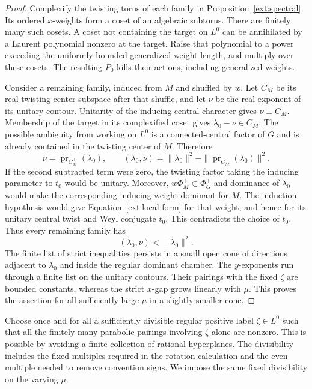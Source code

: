 \begin{proof}
 Complexify the twisting torus of each family in
 Proposition~\ref{ext:spectral}.  Its ordered $x$-weights form a coset
 of an algebraic subtorus.  There are finitely many such cosets.
 A coset not containing the target on $L^0$ can be annihilated by a
 Laurent polynomial nonzero at the target.  Raise that polynomial to
 a power exceeding the uniformly bounded generalized-weight length,
 and multiply over these cosets.  The resulting $P_0$ kills their
 actions, including generalized weights.

 Consider a remaining family, induced from $M$ and shuffled by $w$.
 Let $C_M$ be its real twisting-center subspace after that shuffle, and
 let $\nu$ be the real exponent of its unitary contour.  Unitarity of
 the inducing central character gives $\nu\perp C_M$.  Membership of
 the target in its complexified coset gives
 $\lambda_0-\nu\in C_M$.  The possible ambiguity from working on $L^0$
 is a connected-central factor of $G$ and is already contained in the
 twisting center of $M$.  Therefore
 \begin{equation}\label{ext:orthogonal-projection}
  \nu=\operatorname{pr}_{C_M^\perp}(\lambda_0),\qquad
  (\lambda_0,\nu)=\|\lambda_0\|^2
                       -\|\operatorname{pr}_{C_M}(\lambda_0)\|^2.
 \end{equation}
 If the second subtracted term were zero, the twisting factor taking
 the inducing parameter to $t_0$ would be unitary.  Moreover,
 $w\Phi_M^+\subset\Phi_G^+$ and dominance of $\lambda_0$ would make
 the corresponding inducing weight dominant for $M$.  The induction
 hypothesis would give Equation~\eqref{ext:local-form} for that weight,
 and hence for its unitary central twist and Weyl conjugate $t_0$.
 This contradicts the choice of $t_0$.  Thus every remaining family
 has
 \begin{equation}\label{ext:strict-projection}
       (\lambda_0,\nu)<\|\lambda_0\|^2.
 \end{equation}
 The finite list of strict inequalities persists in a small open cone
 of directions adjacent to $\lambda_0$ and inside the regular dominant
 chamber.  The $y$-exponents run through a finite list on the unitary
 contours.  Their pairings with the fixed $\zeta$ are bounded constants,
 whereas the strict $x$-gap grows linearly with $\mu$.  This proves the
 assertion for all sufficiently large $\mu$ in a slightly smaller cone.
\end{proof}

Choose once and for all a sufficiently divisible regular positive label
$\zeta\in L^0$ such that all the finitely many parabolic pairings
involving $\zeta$ alone are nonzero.  This is possible by avoiding a
finite collection of rational hyperplanes.  The divisibility includes
the fixed multiples required in the rotation calculation and the even
multiple needed to remove convention signs.  We impose the same fixed
divisibility on the varying $\mu$.

